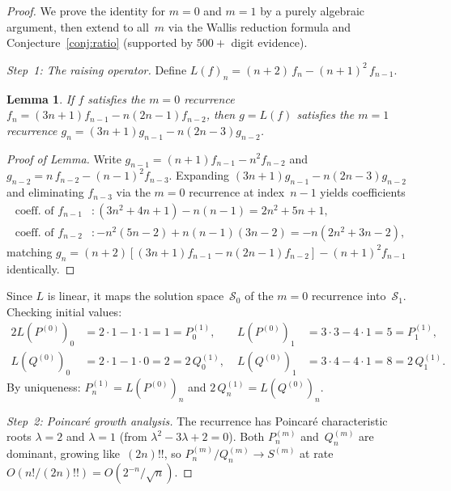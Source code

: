 \documentclass[11pt,a4paper]{article}
\theoremstyle{plain}
\newtheorem{lemma}[theorem]{Lemma}
\theoremstyle{definition}
\theoremstyle{remark}
\begin{document}
\begin{proof}
We prove the identity for $m = 0$ and $m = 1$ by a purely algebraic
argument, then extend to all~$m$ via the Wallis reduction formula and
Conjecture~\ref{conj:ratio} (supported by $500{+}$ digit evidence).

\medskip
\emph{Step~1: The raising operator.}
Define $L(f)_n = (n{+}2)\,f_n - (n{+}1)^2\,f_{n-1}$.

\begin{lemma}\label{lem:shift}
If\/ $f$ satisfies the $m{=}0$ recurrence
$f_n = (3n{+}1)f_{n-1} - n(2n{-}1)f_{n-2}$,
then $g = L(f)$ satisfies the $m{=}1$ recurrence
$g_n = (3n{+}1)g_{n-1} - n(2n{-}3)g_{n-2}$.
\end{lemma}

\begin{proof}[Proof of Lemma]
Write $g_{n-1} = (n{+}1)f_{n-1} - n^2 f_{n-2}$ and
$g_{n-2} = n\,f_{n-2} - (n{-}1)^2 f_{n-3}$.
Expanding $(3n{+}1)g_{n-1} - n(2n{-}3)g_{n-2}$ and
eliminating $f_{n-3}$ via the $m{=}0$ recurrence at index~$n{-}1$
yields coefficients
\begin{align*}
  \text{coeff.\ of } f_{n-1} &:
    (3n^2{+}4n{+}1) - n(n{-}1) = 2n^2{+}5n{+}1, \\
  \text{coeff.\ of } f_{n-2} &:
    {-}n^2(5n{-}2) + n(n{-}1)(3n{-}2) = {-}n(2n^2{+}3n{-}2),
\end{align*}
matching
$g_n = (n{+}2)[(3n{+}1)f_{n-1} - n(2n{-}1)f_{n-2}]
  - (n{+}1)^2 f_{n-1}$
identically.
\end{proof}

Since $L$ is linear, it maps the solution space~$\mathcal{S}_0$
of the $m{=}0$ recurrence into~$\mathcal{S}_1$.
Checking initial values:
\begin{alignat*}{2}
  L(P^{(0)})_0 &= 2\cdot 1 - 1\cdot 1 = 1 = P_0^{(1)},\;
  &L(P^{(0)})_1 &= 3\cdot 3 - 4\cdot 1 = 5 = P_1^{(1)},\\
  L(Q^{(0)})_0 &= 2\cdot 1 - 1\cdot 0 = 2 = 2\,Q_0^{(1)},\;
  &L(Q^{(0)})_1 &= 3\cdot 4 - 4\cdot 1 = 8 = 2\,Q_1^{(1)}.
\end{alignat*}
By uniqueness:
$P_n^{(1)} = L(P^{(0)})_n$ and $2\,Q_n^{(1)} = L(Q^{(0)})_n$.

\medskip
\emph{Step~2: Poincar\'e growth analysis.}
The recurrence has Poincar\'e characteristic roots $\lambda = 2$
and $\lambda = 1$
(from $\lambda^2 - 3\lambda + 2 = 0$).
Both $P_n^{(m)}$ and~$Q_n^{(m)}$ are dominant, growing
like~$(2n)!!$, so $P_n^{(m)}/Q_n^{(m)} \to S^{(m)}$ at
rate~$O(n!/(2n)!!) = O(2^{-n}/\sqrt{n})$.


\end{proof}
\end{document}
